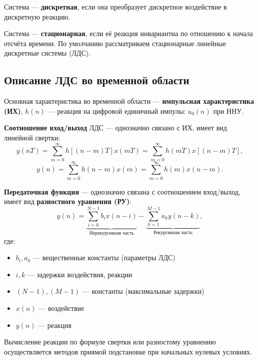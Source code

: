 \documentclass[a4paper, 14pt]{extarticle}
\begin{document}
Система --- \textbf{дискретная}, если она преобразует дискретное воздействие в дискретную реакцию.

Система --- \textbf{стационарная}, если её реакция инвариантна по отношению к начала отсчёта времени. По умолчанию рассматриваем стационарные линейные дискретные системы (ЛДС).

\subsection{Описание ЛДС во временной области}
Основная характеристика во временной области --- \textbf{импульсная характеристика (ИХ)}, $h(n)$ --- реакция на цифровой единичный импульс $u_0(n)$ при ННУ.

\textbf{Соотношение вход/выход} ЛДС --- однозначно связано с ИХ, имеет вид линейной свертки:
\begin{equation}\label{eq:in_out}
    y(nT) = \sum^{\infty}_{m=0} h[ (n - m)T ] x(mT) = \sum^{\infty}_{m=0} h(mT) x [ (n-m)T ],
\end{equation}
\begin{equation}\label{eq:in_out:2}
    y(n) = \sum^{\infty}_{m=0} h(n-m)x(m) = \sum^{\infty}_{m=0} h(m) x(n-m).
\end{equation}

\textbf{Передаточная функция} --- однозначно связана с соотношением вход/выход, имеет вид \textbf{разностного уравнения (РУ)}:
\begin{equation}
    y(n) = \underbrace{\sum^{N-1}_{i=0} b_i x(n-i)}_\text{Нерекурсивная часть} - \underbrace{\sum^{M-1}_{k=1} a_k y(n-k)}_\text{Рекурсивная часть}, 
\end{equation}
где:
\begin{itemize}
    \item $b_i, a_k$ --- вещественные константы (параметры ЛДС)
    \item $i, k$ --- задержки воздействия, реакции
    \item $(N-1), (M-1)$ --- константы (максимальные задержки)
    \item $x(n)$ --- воздействие
    \item $y(n)$ --- реакция
\end{itemize}

Вычисление реакции по формуле свертки или разностому уравнению осуществляется методов приямой подстановке при начальных нулевых условиях.
\end{document}
